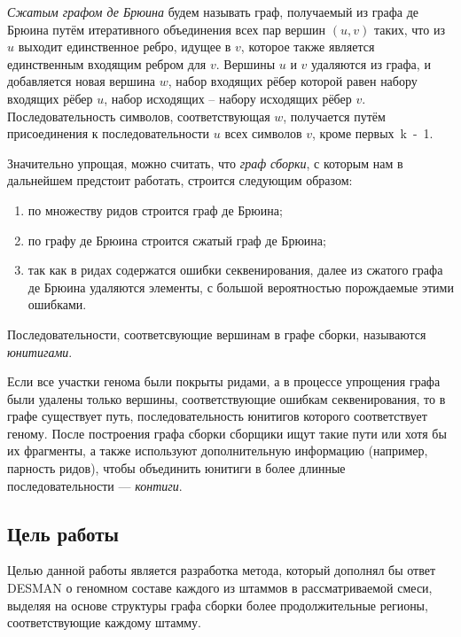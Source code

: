 \documentclass{spbau-diploma}
\begin{document}
\textit{Сжатым графом де Брюина} будем называть граф, получаемый из графа де Брюина путём итеративного объединения всех пар вершин $(u, v)$ таких, что из $u$ выходит единственное ребро, идущее в $v$, которое также является единственным входящим ребром для $v$. Вершины $u$ и $v$ удаляются из графа, и добавляется новая вершина $w$, набор входящих рёбер которой равен набору входящих рёбер $u$, набор исходящих -- набору исходящих рёбер $v$. Последовательность символов, соответствующая $w$, получается путём присоединения к последовательности $u$ всех символов $v$, кроме первых~k~-~1.

Значительно упрощая, можно считать, что \textit{граф сборки}, с которым нам в дальнейшем предстоит работать, строится 
следующим образом:
\begin{enumerate}
    \item по множеству ридов строится граф де Брюина;
    \item по графу де Брюина строится сжатый граф де Брюина;
    \item так как в ридах содержатся ошибки секвенирования, далее из сжатого графа де Брюина удаляются элементы, с большой вероятностью порождаемые этими ошибками.
\end{enumerate}
Последовательности, соответсвующие вершинам в графе сборки, называются \textit{юнитигами}.

Если все участки генома были покрыты ридами, а в процессе упрощения графа были удалены только вершины, соответствующие ошибкам секвенирования, то в графе существует путь, последовательность юнитигов которого соответствует геному. После построения графа сборки сборщики ищут такие пути или хотя бы их фрагменты, а также используют дополнительную информацию (например, парность ридов), чтобы объединить юнитиги в более длинные последовательности --- \textit{контиги}.


\subsection{Цель работы}
Целью данной работы является разработка метода, который дополнял бы ответ DESMAN о геномном составе каждого из штаммов в рассматриваемой смеси, выделяя на основе структуры графа сборки более продолжительные регионы, соответствующие каждому штамму. 
\end{document}
